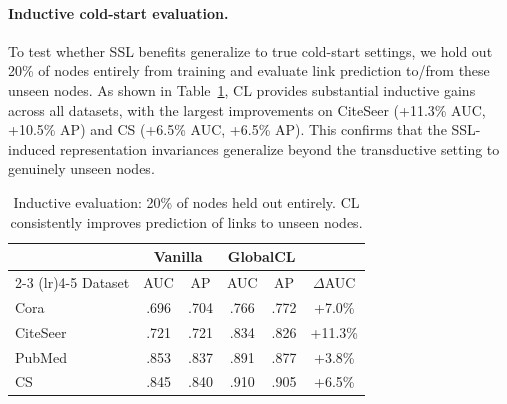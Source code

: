 \paragraph{Inductive cold-start evaluation.}
To test whether SSL benefits generalize to true cold-start settings, we hold out 20\% of nodes entirely from training and evaluate link prediction to/from these unseen nodes. As shown in Table~\ref{tab:inductive}, CL provides substantial inductive gains across all datasets, with the largest improvements on CiteSeer (+11.3\% AUC, +10.5\% AP) and CS (+6.5\% AUC, +6.5\% AP). This confirms that the SSL-induced representation invariances generalize beyond the transductive setting to genuinely unseen nodes.

\begin{table}[t]
\centering
\small
\caption{Inductive evaluation: 20\% of nodes held out entirely. CL consistently improves prediction of links to unseen nodes.}
\label{tab:inductive}
\begin{tabular}{l cc cc c}
\toprule
& \multicolumn{2}{c}{Vanilla} & \multicolumn{2}{c}{GlobalCL} & \\
\cmidrule(lr){2-3} \cmidrule(lr){4-5}
Dataset & AUC & AP & AUC & AP & $\Delta$AUC \\
\midrule
Cora & .696 & .704 & .766 & .772 & +7.0\% \\
CiteSeer & .721 & .721 & .834 & .826 & +11.3\% \\
PubMed & .853 & .837 & .891 & .877 & +3.8\% \\
CS & .845 & .840 & .910 & .905 & +6.5\% \\
\bottomrule
\end{tabular}
\end{table}
